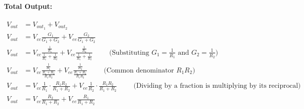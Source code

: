 \paragraph{Total Output:}
\begin{align*}
  V_{out} &= V_{out_1} + V_{out_2} \\
  V_{out} &= V_{cc} \frac{G_1}{G_1 + G_2} + V_{ee} \frac{G_2}{G_1 + G_2} \\
  V_{out} &= V_{cc} \frac{\frac{1}{R_1}}{\frac{1}{R_1} + \frac{1}{R_2}} + V_{ee} \frac{\frac{1}{R_2}}{\frac{1}{R_1} + \frac{1}{R_2}} \hspace{1cm} \text{(Substituting \(G_1 = \frac{1}{R_1}\) and \(G_2 = \frac{1}{R_2}\))} \\
  V_{out} &= V_{cc} \frac{\frac{1}{R_1}}{\frac{R_1 + R_2}{R_1 R_2}} + V_{ee} \frac{\frac{1}{R_2}}{\frac{R_1 + R_2}{R_1 R_2}} \hspace{1cm} \text{(Common denominator \(R_1 R_2\))} \\
  V_{out} &= V_{cc} \frac{1}{R_1}\cdot\frac{R_1 R_2}{R_1 + R_2} + V_{ee} \frac{1}{R_2}\cdot\frac{R_1 R_2}{R_1 + R_2} \hspace{1cm} \text{(Dividing by a fraction is multiplying by its reciprocal)} \\
  V_{out} &= V_{cc} \frac{R_2}{R_1 + R_2} + V_{ee} \frac{R_1}{R_1 + R_2}
\end{align*}

